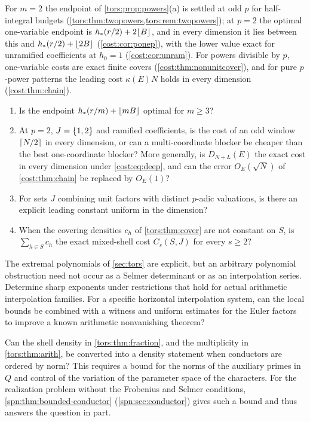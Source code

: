 \begin{question}\label{tors:q:powers}
For $m=2$ the endpoint of \cref{tors:prop:powers}(a) is settled at odd $p$ for half-integral
budgets (\cref{tors:thm:twopowers,tors:rem:twopowers}); at $p=2$ the optimal one-variable
endpoint is $h_*(r/2)+2\lfloor B\rfloor$, and in every dimension it lies between this and
$h_*(r/2)+\lfloor2B\rfloor$ (\cref{cost:cor:ponep}), with the lower value exact for unramified
coefficients at $h_0=1$ (\cref{cost:cor:unram}). For powers divisible by $p$, one-variable
costs are exact finite covers (\cref{cost:thm:nonunitcover}), and for pure $p$-power
patterns the leading cost $\kappa(E)N$ holds in every dimension (\cref{cost:thm:chain}).
\begin{enumerate}[label=\textup{(\alph*)}]
\item Is the endpoint $h_*(r/m)+\lfloor mB\rfloor$ optimal for $m\ge3$?
\item At $p=2$, $J=\{1,2\}$ and ramified coefficients, is the cost of an odd window $\lceil N/2\rceil$
 in every dimension, or can a multi-coordinate blocker be cheaper than the best
 one-coordinate blocker? More generally, is $D_{N+L}(E)$ the exact cost in every dimension
 under \eqref{cost:eq:deep}, and can the error $O_E(\sqrt N)$ of \cref{cost:thm:chain} be
 replaced by $O_E(1)$?
\item For sets $J$ combining unit factors with distinct $p$-adic valuations, is there an
 explicit leading constant uniform in the dimension?
\item When the covering densities $c_h$ of \cref{tors:thm:cover} are not constant on $S$, is
 $\sum_{h\in S}c_h$ the exact mixed-shell cost $C_s(S,J)$ for every $s\ge2$?
\end{enumerate}
\end{question}

\begin{question}\label{tors:q:arithmetic}
The extremal polynomials of \cref{sec:tors} are explicit, but an arbitrary polynomial
obstruction need not occur as a Selmer determinant or as an interpolation series.
Determine sharp exponents under restrictions that hold for actual arithmetic
interpolation families. For a specific horizontal interpolation system, can the local
bounds be combined with a witness and uniform estimates for the Euler factors to improve
a known arithmetic nonvanishing theorem?
\end{question}

\begin{question}\label{tors:q:density}
Can the shell density in \cref{tors:thm:fraction}, and the multiplicity in
\cref{tors:thm:arith}, be converted into a density statement when conductors are ordered
by norm? This requires a bound for the norms of the auxiliary primes in $Q$ and control
of the variation of the parameter space of the characters. For the realization problem
without the Frobenius and Selmer conditions, \cref{spn:thm:bounded-conductor}
(\cref{spn:sec:conductor}) gives such a bound and thus answers the question in part.
\end{question}

